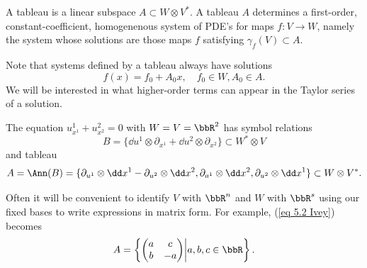 \begin{defn}[Tableau]
    A tableau is a linear subspace $A\subset W\otimes V^\ast$. A tableau $A$ determines a first-order, constant-coefficient, homogenenous system of PDE's for maps $f:V\to W$, namely the system whose solutions are those maps $f$ satisfying $\gamma_f(V)\subset A$.
\end{defn}

Note that systems defined by a tableau always have solutions 
\[f(x)=f_0+A_0x,\quad f_0\in W,A_0\in A.\] 
We will be interested in what higher-order terms can appear in the Taylor series of a solution.

\begin{example}
    The equation $u^1_{x^1}+u^2_{x^2}=0$ with $W=V=\bbR^2$ has symbol relations 
    \[B=\{\dd u^1\otimes \partial_{x^1}+\dd u^2\otimes \partial_{x^2}\}\subset W^\ast\otimes V\]
    and tableau 
    \[A=\Ann(B)=\{\partial_{u^1}\otimes \dd x^1-\partial_{u^2}\otimes\dd x^2,\partial_{a^1}\otimes \dd x^2,\partial_{u^2}\otimes \dd x^1\}\subset W\otimes V^\ast.\label{eq 5.2 Ivey}\]
\end{example}

Often it will be convenient to identify $V$ with $\bbR^n$ and $W$ with $\bbR^s$ using our fixed bases to write expressions in matrix form. For example, (\ref{eq 5.2 Ivey}) becomes 
\[A=\left\{
    \begin{pmatrix}
        a&c\\b&-a
    \end{pmatrix}\middle| a,b,c\in\bbR
\right\}.\]


